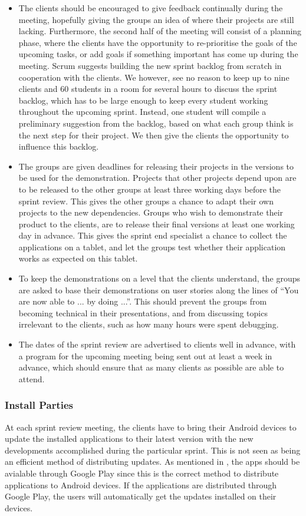 \begin{itemize}
	\item The clients should be encouraged to give feedback continually during the meeting, hopefully giving the groups an idea of where their projects are still lacking. Furthermore, the second half of the meeting will consist of a planning phase, where the clients have the opportunity to re-prioritise the goals of the upcoming tasks, or add goals if something important has come up during the meeting. Scrum suggests building the new 	sprint backlog from scratch in cooperation with the clients. We however, see no reason to keep up to nine clients and 60 students in a room for several hours to discuss the sprint backlog, which has to be large enough to keep every student working throughout the upcoming sprint. Instead, one student will compile a preliminary suggestion from the backlog, based on what each group think is the next step for their project. We then give the clients the opportunity to influence this backlog.
	\item The groups are given deadlines for releasing their projects in the versions to be used for the demonstration. Projects that other projects depend upon are to be released to the other groups at least three working days before the sprint review. This gives the other groups a chance to adapt their own projects to the new dependencies. Groups who wish to demonstrate their product to the clients, are to release their final versions at least one working day in advance. This gives the sprint end specialist a chance to collect the applications on a tablet, and let the groups test whether their application works as expected on this tablet. 
	\item To keep the demonstrations on a level that the clients understand, the groups are asked to base their demonstrations on user stories along the lines of ``You are now able to ... by doing ...''. This should prevent the groups from becoming technical in their presentations, and from discussing topics irrelevant to the clients, such as how many hours were spent debugging. 
	\item The dates of the sprint review are advertised to clients well in advance, with a program for the upcoming meeting being sent out at least a week in advance, which should ensure that as many clients as possible are able to attend. 
\end{itemize}

\subsubsection{Install Parties}
At each sprint review meeting, the clients have to bring their Android devices to update the installed \giraf applications to their latest version with the new developments accomplished during the particular sprint.
This is not seen as being an efficient method of distributing updates.
As mentioned in , the apps should be avialable through Google Play since this is the correct method to distribute applications to Android devices.
If the applications are distributed through Google Play, the users will automatically get the updates installed on their devices.


